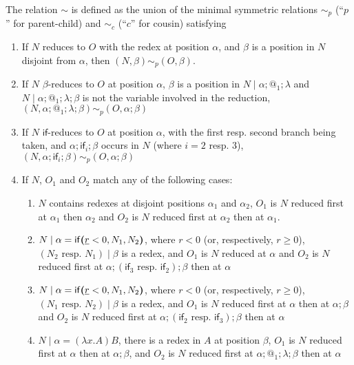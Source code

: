 \begin{definition}
The relation $\sim$ is defined as the union of the minimal symmetric relations $\sim_p$ (``$p$'' for parent-child) and $\sim_c$ (``$c$'' for cousin) satisfying
\begin{enumerate}
    \item If $N$ reduces to $O$ with the redex at position $\alpha$, and $\beta$ is a position in $N$ disjoint from $\alpha$, then $(N,\beta) \sim_p (O,\beta)$.
    
    \item If $N$ $\beta$-reduces to $O$ at position $\alpha$, $\beta$ is a position in $N \mid \alpha;@_1;\lambda$ and $N \mid \alpha;@_1;\lambda;\beta$ is not the variable involved in the reduction, $(N,\alpha;@_1;\lambda;\beta) \sim_p (O, \alpha;\beta)$
    
    \item If $N$ $\textsf{if}$-reduces to $O$ at position $\alpha$, with the first resp. second branch being taken, and $\alpha;\textsf{if}_i;\beta$ occurs in $N$ (where $i = 2$ resp. $3$), $(N,\alpha;\textsf{if}_i;\beta) \sim_p (O,\alpha;\beta)$
    
    \item If $N$, $O_1$ and $O_2$ match any of the following cases:
    \begin{enumerate}
        \item $N$ contains redexes at disjoint positions $\alpha_1$ and $\alpha_2$, $O_1$ is $N$ reduced first at $\alpha_1$ then $\alpha_2$ and $O_2$ is $N$ reduced first at $\alpha_2$ then at $\alpha_1$.
        
        \item $N \mid \alpha = \mathsf{if}\boldsymbol{(}\underline r < 0, N_1, N_2\boldsymbol{)}$, where $r < 0$ (or, respectively, $r \geq 0$), $(N_2 \text{ resp. } N_1) \mid \beta$ is a redex, and $O_1$ is $N$ reduced at $\alpha$ and $O_2$ is $N$ reduced first at $\alpha;(\textsf{if}_3 \text{ resp. } \textsf{if}_2);\beta$ then at $\alpha$
        
        \item $N \mid \alpha = \mathsf{if}\boldsymbol{(}\underline r < 0, N_1, N_2\boldsymbol{)}$, where $r < 0$ (or, respectively, $r \geq 0$), $(N_1 \text{ resp. } N_2) \mid \beta$ is a redex, and $O_1$ is $N$ reduced first at $\alpha$ then at $\alpha;\beta$ and $O_2$ is $N$ reduced first at $\alpha;(\textsf{if}_2 \text{ resp. } \textsf{if}_3);\beta$ then at $\alpha$
        
        \item $N \mid \alpha = (\lambda x. A) B$, there is a redex in $A$ at position $\beta$, $O_1$ is $N$ reduced first at $\alpha$ then at $\alpha;\beta$, and $O_2$ is $N$ reduced first at $\alpha;@_1;\lambda;\beta$ then at $\alpha$
        

\end{enumerate}
\end{enumerate}
\end{definition}
